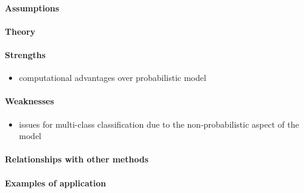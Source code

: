 \paragraph{Assumptions}
\paragraph{Theory}
\paragraph{Strengths}
\begin{itemize}
    \item computational advantages over probabilistic model
\end{itemize}

\paragraph{Weaknesses}
\begin{itemize}
    \item issues for multi-class classification due to the non-probabilistic 
        aspect of the model
\end{itemize}

\paragraph{Relationships with other methods}
\paragraph{Examples of application}

